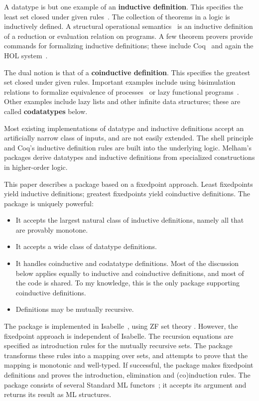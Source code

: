 A datatype is but one example of an {\bf inductive definition}.  This
specifies the least set closed under given rules~\cite{aczel77}.  The
collection of theorems in a logic is inductively defined.  A structural
operational semantics~\cite{hennessy90} is an inductive definition of a
reduction or evaluation relation on programs.  A few theorem provers
provide commands for formalizing inductive definitions; these include
Coq~\cite{paulin92} and again the HOL system~\cite{camilleri92}.

The dual notion is that of a {\bf coinductive definition}.  This specifies
the greatest set closed under given rules.  Important examples include
using bisimulation relations to formalize equivalence of
processes~\cite{milner89} or lazy functional programs~\cite{abramsky90}.
Other examples include lazy lists and other infinite data structures; these
are called {\bf codatatypes} below.

Most existing implementations of datatype and inductive definitions accept
an artificially narrow class of inputs, and are not easily extended.  The
shell principle and Coq's inductive definition rules are built into the
underlying logic.  Melham's packages derive datatypes and inductive
definitions from specialized constructions in higher-order logic.

This paper describes a package based on a fixedpoint approach.  Least
fixedpoints yield inductive definitions; greatest fixedpoints yield
coinductive definitions.  The package is uniquely powerful:
\begin{itemize}
\item It accepts the largest natural class of inductive definitions, namely
  all that are provably monotone.
\item It accepts a wide class of datatype definitions.
\item It handles coinductive and codatatype definitions.  Most of
  the discussion below applies equally to inductive and coinductive
  definitions, and most of the code is shared.  To my knowledge, this is
  the only package supporting coinductive definitions.
\item Definitions may be mutually recursive.
\end{itemize}
The package is implemented in Isabelle~\cite{isabelle-intro}, using ZF set
theory \cite{paulson-set-I,paulson-set-II}.  However, the fixedpoint
approach is independent of Isabelle.  The recursion equations are specified
as introduction rules for the mutually recursive sets.  The package
transforms these rules into a mapping over sets, and attempts to prove that
the mapping is monotonic and well-typed.  If successful, the package
makes fixedpoint definitions and proves the introduction, elimination and
(co)induction rules.  The package consists of several Standard ML
functors~\cite{paulson91}; it accepts its argument and returns its result
as ML structures.

